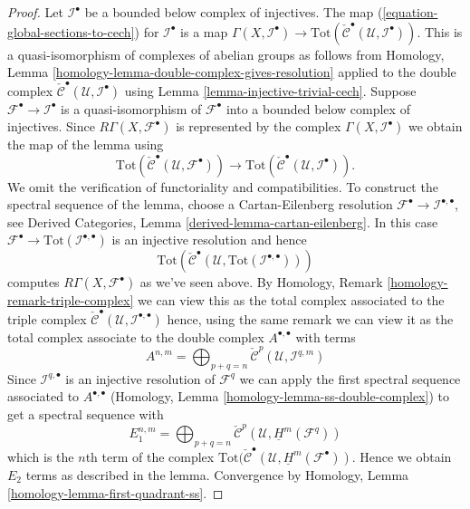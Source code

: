 \begin{proof}
Let ${\mathcal I}^\bullet$ be a bounded below complex of injectives.
The map (\ref{equation-global-sections-to-cech}) for
$\mathcal{I}^\bullet$ is a map
$\Gamma(X, {\mathcal I}^\bullet) \to
\text{Tot}(\check{\mathcal{C}}^\bullet({\mathcal U}, {\mathcal I}^\bullet))$.
This is a quasi-isomorphism of complexes of abelian groups
as follows from
Homology, Lemma \ref{homology-lemma-double-complex-gives-resolution}
applied to the double complex
$\check{\mathcal{C}}^\bullet({\mathcal U}, {\mathcal I}^\bullet)$ using
Lemma \ref{lemma-injective-trivial-cech}.
Suppose ${\mathcal F}^\bullet \to {\mathcal I}^\bullet$ is a quasi-isomorphism
of ${\mathcal F}^\bullet$ into a bounded below complex of injectives.
Since $R\Gamma(X, {\mathcal F}^\bullet)$ is represented by the complex
$\Gamma(X, {\mathcal I}^\bullet)$ we obtain the map of the lemma
using
$$
\text{Tot}(\check{\mathcal{C}}^\bullet({\mathcal U}, {\mathcal F}^\bullet))
\longrightarrow
\text{Tot}(\check{\mathcal{C}}^\bullet({\mathcal U}, {\mathcal I}^\bullet)).
$$
We omit the verification of functoriality and compatibilities.
To construct the spectral sequence of the lemma, choose a Cartan-Eilenberg
resolution $\mathcal{F}^\bullet \to \mathcal{I}^{\bullet, \bullet}$, see
Derived Categories, Lemma \ref{derived-lemma-cartan-eilenberg}. In this
case $\mathcal{F}^\bullet \to \text{Tot}(\mathcal{I}^{\bullet, \bullet})$
is an injective resolution and hence
$$
\text{Tot}(\check{\mathcal{C}}^\bullet({\mathcal U},
\text{Tot}({\mathcal I}^{\bullet, \bullet})))
$$
computes $R\Gamma(X, \mathcal{F}^\bullet)$ as we've seen above.
By Homology, Remark \ref{homology-remark-triple-complex}
we can view this as the total complex associated to the
triple complex
$\check{\mathcal{C}}^\bullet({\mathcal U}, {\mathcal I}^{\bullet, \bullet})$
hence, using the same remark we can view it as the total complex
associate to the double complex $A^{\bullet, \bullet}$ with terms
$$
A^{n, m} =
\bigoplus\nolimits_{p + q = n}
\check{\mathcal{C}}^p({\mathcal U}, \mathcal{I}^{q, m})
$$
Since $\mathcal{I}^{q, \bullet}$ is an injective resolution of
$\mathcal{F}^q$ we can apply the first spectral sequence associated to
$A^{\bullet, \bullet}$
(Homology, Lemma \ref{homology-lemma-ss-double-complex})
to get a spectral sequence with
$$
E_1^{n, m} =
\bigoplus\nolimits_{p + q = n}
\check{\mathcal{C}}^p(\mathcal{U}, \underline{H}^m(\mathcal{F}^q))
$$
which is the $n$th term of the complex
$\text{Tot}(\check{\mathcal{C}}^\bullet(\mathcal{U},
\underline{H}^m(\mathcal{F}^\bullet))$. Hence we obtain
$E_2$ terms as described in the lemma. Convergence by
Homology, Lemma \ref{homology-lemma-first-quadrant-ss}.
\end{proof}

